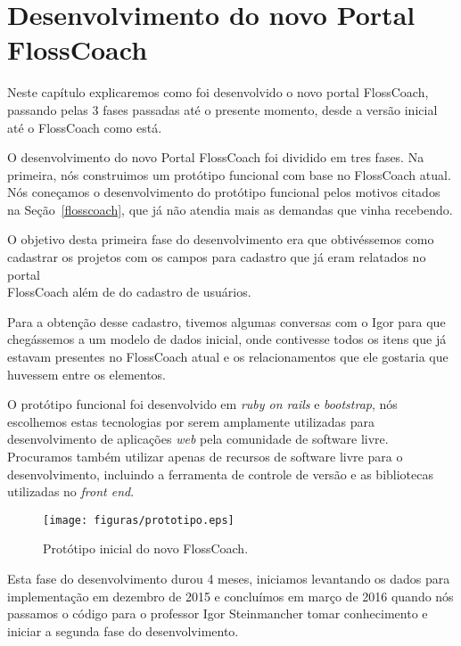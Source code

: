 \chapter{Desenvolvimento do novo Portal \\FlossCoach}

Neste capítulo explicaremos como foi desenvolvido o novo portal FlossCoach, passando
pelas 3 fases passadas até o presente momento, desde a versão inicial até o FlossCoach
como está.

O desenvolvimento do novo Portal FlossCoach foi dividido em tres fases. Na primeira, 
nós construimos um protótipo funcional com base no FlossCoach atual. Nós coneçamos o
desenvolvimento do protótipo funcional pelos motivos citados na Seção~\ref{flosscoach},
que já não atendia mais as demandas que vinha recebendo.

O objetivo desta primeira fase do desenvolvimento era que obtivéssemos como cadastrar 
os projetos com os campos para cadastro que já eram relatados no portal \\FlossCoach 
além de do cadastro de usuários.

Para a obtenção desse cadastro, tivemos algumas conversas com o Igor para que chegássemos
a um modelo de dados inicial, onde contivesse todos os itens que já estavam presentes no
FlossCoach atual e os relacionamentos que ele gostaria que huvessem entre os elementos.



O protótipo funcional foi desenvolvido em \textit{ruby on rails} e \textit{bootstrap},
nós escolhemos estas tecnologias por serem amplamente utilizadas para desenvolvimento
de aplicações \textit{web} pela comunidade de software livre. Procuramos também utilizar
apenas de recursos de software livre para o desenvolvimento, incluindo a ferramenta de 
controle de versão e as bibliotecas utilizadas no \textit{front end}.

\begin{figure}[h]
	\centering
	\label{fig:prototipo}
		\texttt{[image: figuras/prototipo.eps]}
	\caption{Protótipo inicial do novo FlossCoach.}
\end{figure}

Esta fase do desenvolvimento durou 4 meses, iniciamos levantando os dados para implementação
em dezembro de 2015 e concluímos em março de 2016 quando nós passamos o código para o
professor Igor Steinmancher tomar conhecimento e iniciar a segunda fase do desenvolvimento.  

